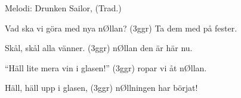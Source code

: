 \begin{song}
\begin{songmeta}
Melodi: Drunken Sailor, (Trad.)
\end{songmeta}
\begin{songtext}
Vad ska vi göra med nya nØllan? (3ggr)
Ta dem med på fester.

Skål, skål alla vänner. (3ggr)
nØllan den är här nu.

\textquotedblleft{}Häll lite mera vin i glasen!\textquotedblright{} (3ggr)
ropar vi åt nØllan.

Häll, häll upp i glasen, (3ggr)
nØllningen har börjat!

\end{songtext}
\end{song}
